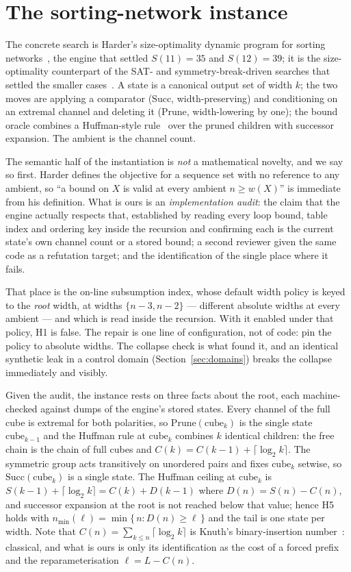 \documentclass[11pt,a4paper]{article}
\theoremstyle{plain}
\theoremstyle{definition}
\theoremstyle{remark}
\newcommand{\wid}{w}
\newcommand{\nmin}{n_{\min}}
\newcommand{\cube}{\mathrm{cube}}
\newcommand{\Succ}{\mathrm{Succ}}
\newcommand{\Prune}{\mathrm{Prune}}
\begin{document}
\section{The sorting-network instance}\label{sec:instance}

The concrete search is Harder's size-optimality dynamic program for sorting
networks~\cite{Harder20}, the engine that settled $S(11)=35$ and $S(12)=39$;
it is the size-optimality counterpart of the SAT- and
symmetry-break-driven searches that settled the smaller
cases~\cite{CCFS16,CCS15,BZ14,EM14}. A
state is a canonical output set of width $k$; the two moves are applying a
comparator ($\Succ$, width-preserving) and conditioning on an extremal channel
and deleting it ($\Prune$, width-lowering by one); the bound oracle combines a
Huffman-style rule~\cite{Huffman52} over the pruned children with successor
expansion. The ambient is the channel count.

The semantic half of the instantiation is \emph{not} a mathematical novelty,
and we say so first. Harder defines the objective for a sequence set with no
reference to any ambient, so ``a bound on $X$ is valid at every ambient
$n \ge \wid(X)$'' is immediate from his definition. What is ours is an
\emph{implementation audit}: the claim that the engine actually respects that,
established by reading every loop bound, table index and ordering key inside
the recursion and confirming each is the current state's own channel count or a
stored bound; a second reviewer given the same code as a refutation target; and
the identification of the single place where it fails.

That place is the on-line subsumption index, whose default width policy is
keyed to the \emph{root} width, at widths $\{n-3, n-2\}$ --- different absolute
widths at every ambient --- and which is read inside the recursion. With it
enabled under that policy, H1 is false. The repair is one line of
configuration, not of code: pin the policy to absolute widths. The collapse
check is what found it, and an identical synthetic leak in a control domain
(Section~\ref{sec:domains}) breaks the collapse immediately and visibly.

Given the audit, the instance rests on three facts about the root, each
machine-checked against dumps of the engine's stored states. Every channel of
the full cube is extremal for both polarities, so $\Prune(\cube_k)$ is the
single state $\cube_{k-1}$ and the Huffman rule at $\cube_k$ combines $k$
identical children: the free chain is the chain of full cubes and
$C(k) = C(k-1) + \lceil \log_2 k\rceil$. The symmetric group acts transitively
on unordered pairs and fixes $\cube_k$ setwise, so $\Succ(\cube_k)$ is a single
state. The Huffman ceiling at $\cube_k$ is $S(k-1) + \lceil \log_2 k \rceil =
C(k) + D(k-1)$ where $D(n) = S(n) - C(n)$, and successor expansion at the root
is not reached below that value; hence H5 holds with
$\nmin(\ell) = \min\{\, n : D(n) \ge \ell \,\}$ and the tail is one state per
width. Note that $C(n) = \sum_{k\le n}\lceil\log_2 k\rceil$ is Knuth's
binary-insertion number~\cite{Knuth73}: classical, and what is ours is only its
identification as the cost of a forced prefix and the reparameterisation
$\ell = L - C(n)$.
\end{document}
